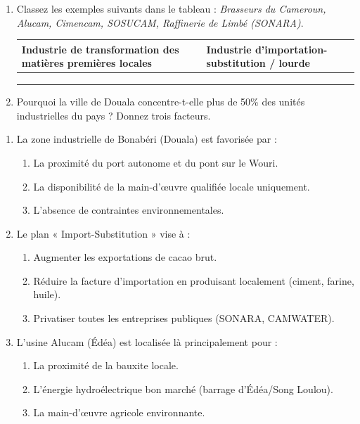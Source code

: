 \documentclass[11pt]{article}
\begin{document}
\begin{exercice}
\begin{enumerate}
    \item Classez les exemples suivants dans le tableau : \textit{Brasseurs du Cameroun, Alucam, Cimencam, SOSUCAM, Raffinerie de Limbé (SONARA)}.
    \begin{center}
    \begin{tabular}{|l|l|}
    \hline
    \textbf{Industrie de transformation des matières premières locales} & \textbf{Industrie d'importation-substitution / lourde} \\
    \hline
     &  \\
    \hline
     &  \\
    \hline
     &  \\
    \hline
    \end{tabular}
    \end{center}
    \item Pourquoi la ville de Douala concentre-t-elle plus de 50\% des unités industrielles du pays ? Donnez trois facteurs.
\end{enumerate}
\end{exercice}

\begin{exercice}
\begin{enumerate}
    \item La zone industrielle de Bonabéri (Douala) est favorisée par :
    \begin{enumerate}
        \item La proximité du port autonome et du pont sur le Wouri.
        \item La disponibilité de la main-d'œuvre qualifiée locale uniquement.
        \item L'absence de contraintes environnementales.
    \end{enumerate}
    \item Le plan « Import-Substitution » vise à :
    \begin{enumerate}
        \item Augmenter les exportations de cacao brut.
        \item Réduire la facture d'importation en produisant localement (ciment, farine, huile).
        \item Privatiser toutes les entreprises publiques (SONARA, CAMWATER).
    \end{enumerate}
    \item L'usine Alucam (Édéa) est localisée là principalement pour :
    \begin{enumerate}
        \item La proximité de la bauxite locale.
        \item L'énergie hydroélectrique bon marché (barrage d'Édéa/Song Loulou).
        \item La main-d'œuvre agricole environnante.
    \end{enumerate}
\end{enumerate}
\end{exercice}
\end{document}
